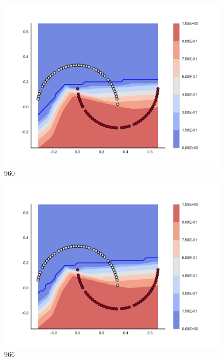 \begin{subfigure}[b]{0.09\textwidth}
    \includegraphics[clip, trim=2.35cm 1.75cm 4.5cm 0cm,width=\textwidth]{img/convergence/960.pdf}
    \caption{960}
    \label{fig:convergence_960}
\end{subfigure}
%
\begin{subfigure}[b]{0.09\textwidth}
    \includegraphics[clip, trim=2.35cm 1.75cm 4.5cm 0cm,width=\textwidth]{img/convergence/966.pdf}
    \caption{966}
    \label{fig:convergence_966}
\end{subfigure}
%
